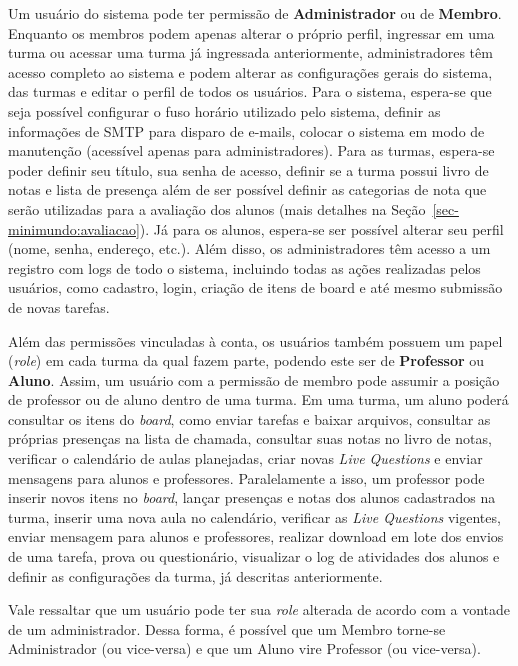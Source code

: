 Um usuário do sistema pode ter permissão de \textbf{Administrador} ou de \textbf{Membro}. Enquanto os membros podem apenas alterar o próprio perfil, ingressar em uma turma ou acessar uma turma já ingressada anteriormente, administradores têm acesso completo ao sistema e podem alterar as configurações gerais do sistema, das turmas e editar o perfil de todos os usuários. Para o sistema, espera-se que seja possível configurar o fuso horário utilizado pelo sistema, definir as informações de SMTP para disparo de e-mails, colocar o sistema em modo de manutenção (acessível apenas para administradores). Para as turmas, espera-se poder definir seu título, sua senha de acesso, definir se a turma possui livro de notas e lista de presença além de ser possível definir as categorias de nota que serão utilizadas para a avaliação dos alunos (mais detalhes na Seção~{\ref{sec-minimundo:avaliacao}}). Já para os alunos, espera-se ser possível alterar seu perfil (nome, senha, endereço, etc.). Além disso, os administradores têm acesso a um registro com logs de todo o sistema, incluindo todas as ações realizadas pelos usuários, como cadastro, login, criação de itens de board e até mesmo submissão de novas tarefas.

Além das permissões vinculadas à conta, os usuários também possuem um papel (\textit{role}) em cada turma da qual fazem parte, podendo este ser de \textbf{Professor} ou \textbf{Aluno}. Assim, um usuário com a permissão de membro pode assumir a posição de professor ou de aluno dentro de uma turma. Em uma turma, um aluno poderá consultar os itens do \textit{board}, como enviar tarefas e baixar arquivos, consultar as próprias presenças na lista de chamada, consultar suas notas no livro de notas, verificar o calendário de aulas planejadas, criar novas \textit{Live Questions} e enviar mensagens para alunos e professores. Paralelamente a isso, um professor pode inserir novos itens no \textit{board}, lançar presenças e notas dos alunos cadastrados na turma, inserir uma nova aula no calendário, verificar as \textit{Live Questions} vigentes, enviar mensagem para alunos e professores, realizar download em lote dos envios de uma tarefa, prova ou questionário, visualizar o log de atividades dos alunos e definir as configurações da turma, já descritas anteriormente.

Vale ressaltar que um usuário pode ter sua \textit{role} alterada de acordo com a vontade de um administrador. Dessa forma, é possível que um Membro torne-se Administrador (ou vice-versa) e que um Aluno vire Professor (ou vice-versa).


